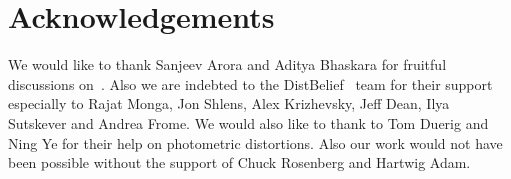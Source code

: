\section{Acknowledgements}
We would like to thank Sanjeev Arora and Aditya Bhaskara for fruitful discussions on~\cite{arora2013bounds}. Also we are indebted to the DistBelief~\cite{dean2012large} team for their support especially to Rajat Monga, Jon Shlens, Alex Krizhevsky, Jeff Dean, Ilya Sutskever and Andrea Frome. We would also like to thank to Tom Duerig and Ning Ye for their help on photometric distortions. Also our work would not have been possible without the support of Chuck Rosenberg and Hartwig Adam.
